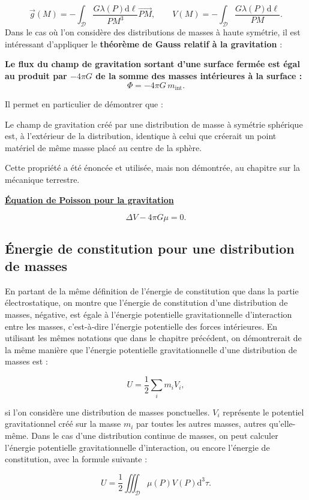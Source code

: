 \documentclass[11pt,a4paper]{article}
\newif\ifinexample
\newcommand{\dd}{\mathrm d}
\newcommand{\titr}[1]{\par\ifinexample\else\Needspace{4\baselineskip}\fi\textbf{\underline{#1}}\par\nopagebreak[3]}
\newcommand{\D}{\mathcal D}\newcommand{\R}{\mathcal R}
\begin{document}
\[\vec g(M)=-\int_\D\frac{G\lambda(P)\dd\ell}{PM^3}\overrightarrow{PM},\qquad V(M)=-\int_\D\frac{G\lambda(P)\dd\ell}{PM}.\]
Dans le cas où l'on considère des distributions de masses à haute symétrie, il est intéressant d'appliquer le \textbf{théorème de Gauss relatif à la gravitation} :
\begin{cadre}\textbf{Le flux du champ de gravitation sortant d'une surface fermée est égal au produit par $-4\pi G$ de la somme des masses intérieures à la surface :}\[\Phi=-4\pi G\,m_{\mathrm{int}}.\]\end{cadre}
Il permet en particulier de démontrer que :
\begin{cadre}Le champ de gravitation créé par une distribution de masse à symétrie sphérique est, à l'extérieur de la distribution, identique à celui que créerait un point matériel de même masse placé au centre de la sphère.\end{cadre}
Cette propriété a été énoncée et utilisée, mais non démontrée, au chapitre sur la mécanique terrestre.
\titr{Équation de Poisson pour la gravitation}
\begin{cadre}\[\Delta V-4\pi G\mu=0.\]\end{cadre}
\subsection{Énergie de constitution pour une distribution de masses}
En partant de la même définition de l'énergie de constitution que dans la partie électrostatique, on montre que l'énergie de constitution d'une distribution de masses, négative, est égale à l'énergie potentielle gravitationnelle d'interaction entre les masses, c'est-à-dire l'énergie potentielle des forces intérieures.
En utilisant les mêmes notations que dans le chapitre précédent, on démontrerait de la même manière que l'énergie potentielle gravitationnelle d'une distribution de masses est :
\begin{cadre}\[U=\frac12\sum_i m_iV_i,\]\end{cadre}
si l'on considère une distribution de masses ponctuelles. $V_i$ représente le potentiel gravitationnel créé sur la masse $m_i$ par toutes les autres masses, autres qu'elle-même.
Dans le cas d'une distribution continue de masses, on peut calculer l'énergie potentielle gravitationnelle d'interaction, ou encore l'énergie de constitution, avec la formule suivante :
\begin{cadre}\[U=\frac12\iiint_\D\mu(P)V(P)\dd^3\tau.\]\end{cadre}
\end{document}
